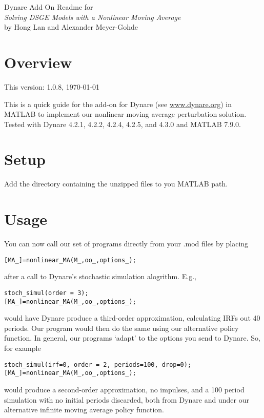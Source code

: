 \documentclass[12pt,leqno,subeqn,aer,aertt,harvard,ulem]{article}
\newlength{\oldbaselineskip}
\newlength{\newbaselineskip}
\begin{document}
    \setlength{\oldbaselineskip}{\baselineskip}
    \setlength{\newbaselineskip}{1.5\baselineskip}
    \setlength{\baselineskip}{\newbaselineskip}
    \abovedisplayskip=2pt
\belowdisplayskip=2pt
\abovedisplayshortskip=2pt
\belowdisplayshortskip=2pt
{\large Dynare Add On Readme for\\ {\it Solving DSGE Models with a Nonlinear Moving Average}}\\
by Hong Lan and Alexander Meyer-Gohde
\section{Overview}
This version: 1.0.8, \today

This is a quick guide for the add-on for Dynare (see \url{www.dynare.org}) in MATLAB to implement our nonlinear moving average perturbation solution. Tested with Dynare 4.2.1,  4.2.2, 4.2.4, 4.2.5, and 4.3.0 and MATLAB 7.9.0.

\section{Setup}

Add the directory containing the unzipped files to you MATLAB path.

\section{Usage}

You can now call our set of programs directly from your .mod files by placing
\begin{verbatim}
[MA_]=nonlinear_MA(M_,oo_,options_);
\end{verbatim}
after a call to Dynare's stochastic simulation alogrithm. E.g.,
\begin{verbatim}
stoch_simul(order = 3);
[MA_]=nonlinear_MA(M_,oo_,options_);
\end{verbatim}
would have Dynare produce a third-order approximation, calculating IRFs out 40 periods. Our program would then do the same using our alternative policy function. In general, our programs `adapt' to the options you send to Dynare. So, for example
\begin{verbatim}
stoch_simul(irf=0, order = 2, periods=100, drop=0);
[MA_]=nonlinear_MA(M_,oo_,options_);
\end{verbatim}
would produce a second-order approximation, no impulses, and a 100 period simulation with no initial periods discarded, both from Dynare and under our alternative infinite moving average policy function. 
\end{document}
